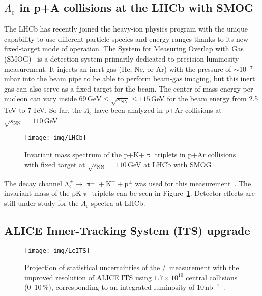 \subsection{$\Lambda_\mathrm{c}$ in p+A collisions at the LHCb with SMOG}
The LHCb has recently joined the heavy-ion physics program with the unique capability to use different particle species and energy ranges thanks to its new fixed-target mode of operation. The System for Measuring Overlap with Gas (SMOG)~\cite{SMOG} is a detection system primarily dedicated to precision luminosity measurement. It injects an inert gas (He, Ne, or Ar) with the pressure of $\sim$10$^{-7}\,$mbar into the beam pipe to be able to perform beam-gas imaging, but this inert gas can also serve as a fixed target for the beam. The center of mass energy per nucleon can vary inside $69\,\text{GeV} \leq \sqrt{s_\mathrm{NN}} \leq 115\,$GeV for the beam energy from 2.5$\,$TeV to 7$\,$TeV\@. So far, the $\Lambda_\mathrm{c}$ have been analyzed in p+Ar collisions at $\sqrt{s_\mathrm{NN}} = 110\,$GeV\@.

\begin{figure}[!htb]
\centering
\texttt{[image: img/LHCb]}
\caption[Invariant mass spectrum of the p+K+$\uppi$ triplets in p+Ar collisions with fixed target.]{Invariant mass spectrum of the p+K+$\uppi$ triplets in p+Ar collisions with fixed target at $\sqrt{s_\mathrm{NN}} = 110\,$GeV at LHCb with SMOG~\cite{LHCbQMpresentation}.}
\label{fig:LHCb}
\end{figure}

The decay channel $\mathrm{\Lambda_c^\pm \rightarrow \uppi^\pm + K^\mp + p^\pm}$ was used for this measurement~\cite{LHCbQMpresentation}. The invariant mass of the pK$\uppi$ triplets can be seen in Figure~\ref{fig:LHCb}. Detector effects are still under study for the $\Lambda_\mathrm{c}$ spectra at LHCb.

\subsection{ALICE Inner-Tracking System (ITS) upgrade}

\begin{figure}[!htb]
\centering
\texttt{[image: img/LcITS]}
\caption[Projection of statistical uncertainties of the \Lambdac/\dzero\ measurement with the improved resolution of ALICE ITS\@.]{Projection of statistical uncertainties of the \Lambdac/\dzero\ measurement with the improved resolution of ALICE ITS using $1.7\times 10^{10}$ central collisions (0--10$\,\%$), corresponding to an integrated luminosity of 10$\,$nb$^{-1}$~\cite{ITS_CDR}.}
\label{ITS_Lc}
\end{figure}

